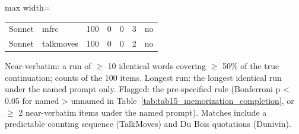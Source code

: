 \begin{table}[t]
\begin{adjustbox}{max width=\linewidth}
\begin{tabular}{llrrrrr}
Sonnet & mfrc & 100 & 0 & 0 & 3 & no \\
Sonnet & talkmoves & 100 & 0 & 0 & 2 & no \\
\bottomrule
\end{tabular}
\end{adjustbox}
\par\smallskip\footnotesize\raggedright Near-verbatim: a run of $\geq$ 10 identical words covering $\geq$ 50\% of the true continuation; counts of the 100 items. Longest run: the longest identical run under the named prompt only. Flagged: the pre-specified rule (Bonferroni p < 0.05 for named > unnamed in Table~\ref{tab:tab15_memorization_completion}, or $\geq$ 2 near-verbatim items under the named prompt). Matches include a predictable counting sequence (TalkMoves) and Du Bois quotations (Dunivin).
\end{table}
